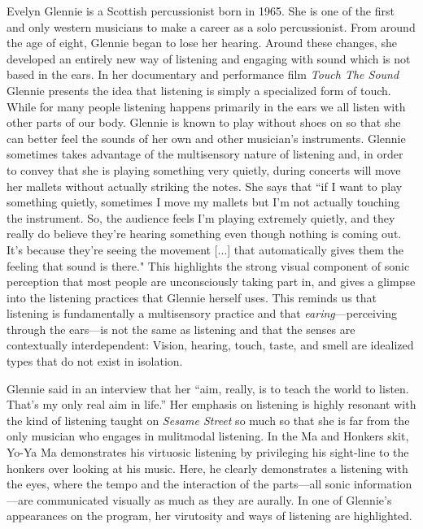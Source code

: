 \documentclass[12pt,letterpaper]{article}
\newcommand{\ses}{\textit{Sesame Street }}
\begin{document}
	Evelyn Glennie is a Scottish percussionist born in 
	1965.\autocite[6]{Glennie} She is one of the first and only western 
	musicians to make a career as a solo percussionist. From 
	around the age of eight, Glennie began to lose her 
	hearing.\autocite[40]{Glennie} Around these changes, she developed an 
	entirely new way of listening and engaging with sound which is not based
	in the ears. In her documentary and performance film \textit{Touch The 
	Sound} Glennie presents the idea that listening is simply a specialized
	form of touch. While for many people listening happens primarily in the
	ears we all listen with other parts of our body. Glennie is known
	to play without shoes on so that she can better feel the sounds of her 
	own and other musician's instruments. Glennie sometimes takes 
	advantage of the
	multisensory nature of listening and, in order to convey that she is 
	playing something very quietly, during concerts will move
	her mallets without actually striking the notes. She says that ``if I 
	want to play something quietly, sometimes I move my mallets but I'm not
	actually touching the instrument. So, the audience feels I'm playing 
	extremely quietly, and they really do believe they're hearing something
	 even though nothing is coming out. It's because they're seeing the 
	movement [...] that automatically gives them the feeling that sound is 
	there." This highlights the strong visual component of sonic perception
	that most people are unconsciously taking part in, and gives a glimpse 
	into the
	listening practices that Glennie herself uses.\autocite[109]{Ceraso}  
	This reminds us that listening is fundamentally a multisensory practice
	and that \textit{earing}---perceiving through the ears---is not the 
	same as listening\autocite[105]{Ceraso} and that the senses are 
	contextually interdependent: Vision, hearing, touch, taste, and smell 
	are idealized types that do not exist in 
	isolation.\autocite[212]{Holmes}
	
	Glennie said in an interview that her ``aim, really, is to teach the 
	world to listen. That's my only real aim in 
	life.''\autocite[172]{Holmes} Her emphasis on listening is highly 
	resonant with the kind of listening taught on
	\ses so much so that she is far from the only musician who engages in
	mulitmodal listening. In the Ma and Honkers skit, Yo-Ya Ma demonstrates
	his virtuosic listening by privileging his sight-line to the honkers 
	over looking at his music. Here, he clearly demonstrates a listening 
	with the eyes, where the tempo and the interaction of the parts---all
	sonic information---are communicated visually as much as they are 
	aurally. In one of Glennie's appearances on the program, her virutosity
	and ways of listening are highlighted.   
\end{document}
